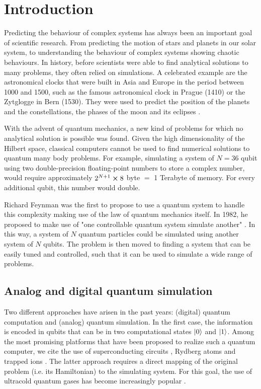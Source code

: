\chapter{Introduction}

Predicting the behaviour of complex systems has always been an important goal of scientific research. From predicting the motion of stars and planets in our solar system, to understanding the behaviour of complex systems showing chaotic behaviours. In history, before scientists were able to find analytical solutions to many problems, they often relied on simulations. A
celebrated example are the astronomical clocks that
were built in Asia and Europe in the period between 1000 and
1500, such as the famous astronomical clock in Prague (1410) or the Zytglogge in Bern (1530). They were used to predict the position of the planets and the constellations, the phases of the moon and its eclipses \cite{bloch2012}.

With the advent of quantum mechanics, a new kind of problems for which no analytical solution is possible was found. Given the high dimensionality of the Hilbert space, classical computers cannot be used to find numerical solutions to quantum many body problems. For example, simulating a system of $N=36$ qubit using two double-precision floating-point numbers to store a complex number, would require approximately $2^{N+1} \cross 8$ byte $=$ 1 Terabyte of memory. For every additional qubit, this number would double.

Richard Feynman was the first to propose to use a quantum system to handle this complexity making use of the law of quantum mechanics itself. In 1982, he proposed to make use of "one controllable quantum system simulate another" \cite{feynman1982}. In this way, a system of $N$ quantum particles could be simulated using another system of $N$ qubits. The problem is then moved to finding a system that can be easily tuned and controlled, such that it can be used to simulate a wide range of problems.

\section{Analog and digital quantum simulation}

Two different approaches have arisen in the past years: (digital) quantum computation and (analog) quantum simulation. In the first case, the information is encoded in qubits that can be in two computational states $\ket{0}$ and $\ket{1}$. Among the most promising platforms that have been proposed to realize such a quantum computer, we cite the use of superconducting circuits \cite{blais2021a}, Rydberg atoms \cite{wu2021a} and trapped ions \cite{bruzewicz2019}. The latter approach requires a direct mapping of the original problem (i.e. its Hamiltonian) to the simulating system. For this goal, the use of ultracold quantum gases has become increasingly popular \cite{bloch2012}.

